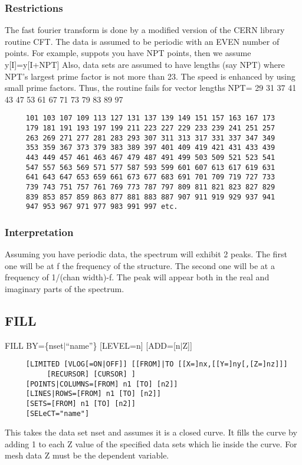 \subsubsection{Restrictions}
The fast fourier transform is done by a modified version of the CERN
library routine CFT.  The data is assumed to be periodic with an EVEN
number of points.  For example, suppots you have NPT points, then we
assume y[I]=y[I+NPT] Also, data sets are assumed to have lengths (say
NPT) where NPT's largest prime factor is not more than 23.  The speed
is enhanced by using small prime factors.  Thus, the routine fails for
vector lengths 
NPT=  29  31  37  41  43  47  53  61  67  71  73  79  83  89  97
\begin{verbatim}
     101 103 107 109 113 127 131 137 139 149 151 157 163 167 173
     179 181 191 193 197 199 211 223 227 229 233 239 241 251 257
     263 269 271 277 281 283 293 307 311 313 317 331 337 347 349
     353 359 367 373 379 383 389 397 401 409 419 421 431 433 439
     443 449 457 461 463 467 479 487 491 499 503 509 521 523 541
     547 557 563 569 571 577 587 593 599 601 607 613 617 619 631
     641 643 647 653 659 661 673 677 683 691 701 709 719 727 733
     739 743 751 757 761 769 773 787 797 809 811 821 823 827 829
     839 853 857 859 863 877 881 883 887 907 911 919 929 937 941
     947 953 967 971 977 983 991 997 etc.
\end{verbatim}
\subsubsection{Interpretation}
Assuming you have periodic data, the spectrum will exhibit 2 peaks.
The first one will be at f the frequency of the structure.  The second
one will be at a frequency of 1/(chan width)-f.  The peak will appear
both in the real and imaginary parts of the spectrum.  
\subsection{FILL}
FILL BY=\{nset$|$``name''\} [LEVEL=n] [ADD=[n$|$Z]] 
\begin{verbatim}
     [LIMITED [VLOG[=ON|OFF]] [[FROM]|TO [[X=]nx,[[Y=]ny[,[Z=]nz]]]
          [RECURSOR] [CURSOR] ] 
     [POINTS|COLUMNS=[FROM] n1 [TO] [n2]] 
     [LINES|ROWS=[FROM] n1 [TO] [n2]] 
     [SETS=[FROM] n1 [TO] [n2]] 
     [SELeCT="name"] 
\end{verbatim}
This  takes the data set nset and assumes it is a closed curve.  It fills
the curve by adding 1 to each Z value of the specified  data  sets  which
lie inside the curve.  For mesh data Z must be the dependent variable.  

